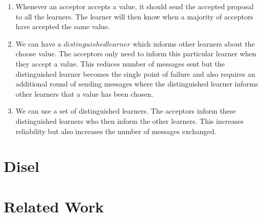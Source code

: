 \begin{enumerate}
  \item Whenever an acceptor accepts a value, it should send the accepted proposal
    to all the learners. The learner will then know when a majority of acceptors
    have accepted the same value.
  \item We can have a $distinguished learner$ which informs other learners about
    the choose value. The acceptors only need to inform this particular learner
    when they accept a value. This reduces number of messages sent but the
    distinguished learner becomes the single point of failure and also requires
    an additional round of sending messages where the distinguished learner informs
    other learners that a value has been chosen.
  \item We can use a set of distinguished learners. The acceptors inform these
    distinguished learners who then inform the other learners. This increases
    reliability but also increases the number of messages exchanged.
\end{enumerate}


\section{Disel}

\section{Related Work}
